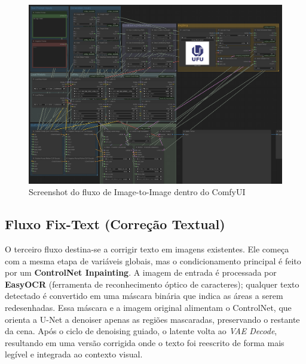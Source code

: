 \documentclass[12pt, %
openright, 
oneside, %
a4paper,    %
brazil]{facom-ufu-abntex2}
\begin{document}
\begin{figure}[H]
    \centering
	\includegraphics[width=\linewidth]{figuras/img2img-flow.png}
	\caption[Fluxo Image-to-Image (ComfyUI)]{Screenshot do fluxo de Image-to-Image dentro do ComfyUI}
	\label{fig:img2imgFlow}
\end{figure}

\subsection{Fluxo Fix-Text (Correção Textual)}

O terceiro fluxo destina-se a corrigir texto em imagens existentes. Ele começa com a mesma etapa de variáveis globais, mas o condicionamento principal é feito por um \textbf{ControlNet Inpainting}. A imagem de entrada é processada por \textbf{EasyOCR} (ferramenta de reconhecimento óptico de caracteres); qualquer texto detectado é convertido em uma máscara binária que indica as áreas a serem redesenhadas. Essa máscara e a imagem original alimentam o ControlNet, que orienta a U-Net a denoiser apenas as regiões mascaradas, preservando o restante da cena. Após o ciclo de denoising guiado, o latente volta ao \textit{VAE Decode}, resultando em uma versão corrigida onde o texto foi reescrito de forma mais legível e integrada ao contexto visual.
\end{document}
